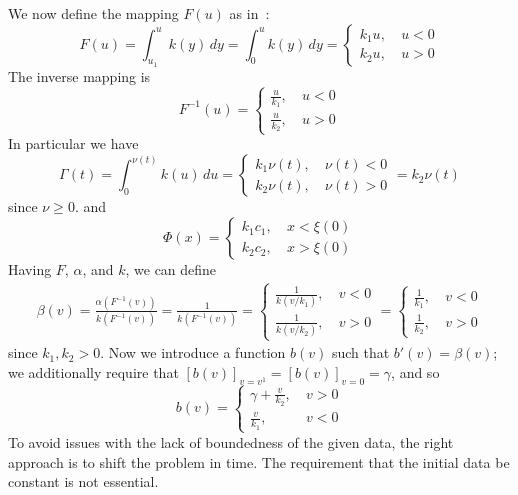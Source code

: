 We now define the mapping \(F(u)\) as in~\cite{abdulla16a}:
\begin{equation}
  F(u)
  = \int_{u_1}^u k(y) \,dy
  = \int_0^u k(y) \,dy
  = \begin{cases}
    k_1 u,~&u<0
    \\
    k_2 u,~&u>0
    \end{cases}
\end{equation}
The inverse mapping is
\begin{equation}
  F^{-1}(u) =
  \begin{cases}
    \frac{u}{k_1},~&u<0
    \\
    \frac{u}{k_2},~&u>0
  \end{cases}
\end{equation}
In particular we have
\[
  \Gamma(t)
  = \int_0^{\nu(t)} k(u) \,du
  = \begin{cases}
    k_1 \nu(t),~&\nu(t)<0
    \\
    k_2 \nu(t),~&\nu(t)>0
  \end{cases}
  = k_2 \nu(t)
\]
since \(\nu \geq 0\).
and
\[
  \Phi(x) =
  \begin{cases}
    k_1 c_1,~&x<\xi(0)
    \\
    k_2 c_2,~&x>\xi(0)
  \end{cases}
\]
Having \(F\), \(\alpha{}\), and \(k\), we can define
\begin{gather}
  \beta(v)
  = \frac{\alpha(F^{-1}(v))}{k(F^{-1}(v))}
  = \frac{1}{k(F^{-1}(v))}\nonumber
  = \begin{cases}
    \frac{1}{k(v/k_1)},~&v<0
    \\
    \frac{1}{k(v/k_2)},~&v>0
  \end{cases}\nonumber
  =\begin{cases}
    \frac{1}{k_1},~&v<0
    \\
    \frac{1}{k_2},~&v>0
  \end{cases}
\end{gather}
since \(k_1, k_2 > 0\).
Now we introduce a function \(b(v)\) such that \(b'(v) = \beta(v)\);
we additionally require that \([b(v)]_{v=v^1} = [b(v)]_{v=0} = \gamma{}\), and so
\begin{equation}
  b(v) =
  \begin{cases}
    \gamma + \frac{v}{k_2},~&v>0
    \\
    \frac{v}{k_1},~&v<0
  \end{cases}
\end{equation}
%
To avoid issues with the lack of boundedness of the given data, the right approach is to shift the problem in time.
The requirement that the initial data be constant is not essential.

